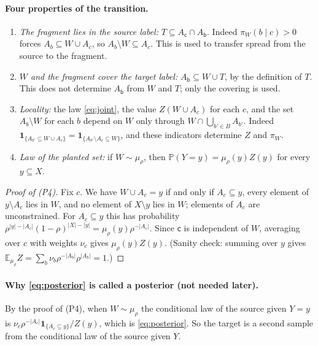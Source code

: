 \documentclass[11pt]{article}
\numberwithin{equation}{section}
\newcommand{\PP}{\mathbb P}
\newcommand{\EE}{\mathbb E}
\newcommand{\ind}{\mathbf 1}
\newcommand{\src}{\mathsf c}
\newcommand{\tgt}{\mathsf b}
\begin{document}
\paragraph{Four properties of the transition.}
\begin{enumerate}[label=(P\arabic*),leftmargin=2.6em,itemsep=3pt]
 \item \emph{The fragment lies in the source label:}
 $T\subseteq A_{\src}\cap A_{\tgt}$. Indeed $\pi_W(b\mid c)>0$ forces
 $A_b\subseteq W\cup A_c$, so $A_b\setminus W\subseteq A_c$. This is
 used to transfer spread from the source to the fragment.
 \item \emph{$W$ and the fragment cover the target label:}
 $A_{\tgt}\subseteq W\cup T$, by the definition of $T$. This does not
 determine $A_\tgt$ from $W$ and $T$; only the covering is used.
 \item \emph{Locality:} the law \eqref{eq:joint}, the value
 $Z(W\cup A_c)$ for each $c$, and the set $A_b\setminus W$ for each $b$
 depend on $W$ only through $W\cap\bigcup_{b'\in B}A_{b'}$. Indeed
 $\ind_{\{A_{b'}\subseteq W\cup A_c\}}
 =\ind_{\{A_{b'}\setminus A_c\subseteq W\}}$, and these indicators
 determine $Z$ and $\pi_W$.
 \item \emph{Law of the planted set:} if $W\sim\mu_\rho$, then
 $\PP(Y=y)=\mu_\rho(y)Z(y)$ for every $y\subseteq X$.
\end{enumerate}

\begin{proof}[Proof of (P4)]
Fix $c$. We have $W\cup A_c=y$ if and only if $A_c\subseteq y$, every
element of $y\setminus A_c$ lies in $W$, and no element of
$X\setminus y$ lies in $W$; elements of $A_c$ are unconstrained. For
$A_c\subseteq y$ this has probability
$\rho^{|y|-|A_c|}(1-\rho)^{|X|-|y|}=\mu_\rho(y)\rho^{-|A_c|}$. Since
$\src$ is independent of $W$, averaging over $c$ with weights $\nu_c$
gives $\mu_\rho(y)Z(y)$. (Sanity check: summing over $y$ gives
$\EE_{\mu_\rho}Z=\sum_b\nu_b\rho^{-|A_b|}\rho^{|A_b|}=1$.)
\end{proof}

\paragraph{Why \eqref{eq:posterior} is called a posterior (not needed
later).}
By the proof of (P4), when $W\sim\mu_\rho$ the conditional law of the
source given $Y=y$ is
$\nu_c\rho^{-|A_c|}\ind_{\{A_c\subseteq y\}}/Z(y)$, which is
\eqref{eq:posterior}. So the target is a second sample from the
conditional law of the source given $Y$.
\end{document}
